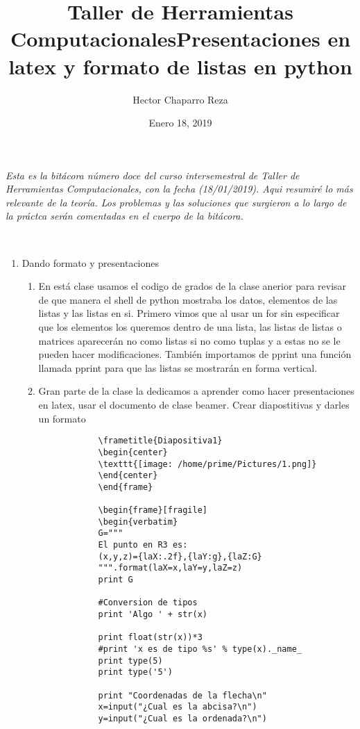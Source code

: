 \documentclass[letterpaper, 12pt, oneside]{article}
\title{\Huge{Taller de Herramientas Computacionales}}
\author{Hector Chaparro Reza}
\date{Enero 18, 2019}
\begin{document}
	\maketitle
	\it Esta es la bit\'acora número doce del curso intersemestral de Taller de Herramientas Computacionales, con la fecha (18/01/2019). Aqui resumir\'e lo m\'as relevante de la teor\'ia. Los problemas y las soluciones que surgieron a lo largo de la pr\'actca ser\'an comentadas en el cuerpo de la bit\'acora.\\
	\newpage
	
	
	\title{\Huge{Presentaciones en latex y formato de listas en python}}\\
	
	\begin{enumerate}
		\item {Dando formato y presentaciones}
		\begin{enumerate}
			\item En está clase usamos el codigo de grados de la clase anerior para revisar de que manera el shell de python mostraba los datos, elementos de las listas y las listas en si. Primero vimos que al usar un for sin especificar que los elementos los queremos dentro de una lista, las listas de listas o matrices aparecerán no como listas si no como tuplas y a estas no se le pueden hacer modificaciones. También importamos de pprint una función llamada pprint para que las listas se mostrarán en forma vertical.
			
			\item Gran parte de la clase la dedicamos a aprender como hacer presentaciones en latex, usar el documento de clase beamer. Crear diapostitivas y darles un formato\\
			
			\begin{verbatim}
			\frametitle{Diapositiva1}
			\begin{center}
			\texttt{[image: /home/prime/Pictures/1.png]}
			\end{center}
			\end{frame}
			
			\begin{frame}[fragile]
			\begin{verbatim}
			G="""
			El punto en R3 es:
			(x,y,z)={laX:.2f},{laY:g},{laZ:G} 
			""".format(laX=x,laY=y,laZ=z)
			print G
			
			#Conversion de tipos
			print 'Algo ' + str(x)
			
			print float(str(x))*3
			#print 'x es de tipo %s' % type(x)._name_
			print type(5)
			print type('5')
			
			print "Coordenadas de la flecha\n"
			x=input("¿Cual es la abcisa?\n")
			y=input("¿Cual es la ordenada?\n")	
		
			\end{verbatim}
			
		
		\end{enumerate}
	\end{enumerate}
\end{document}
